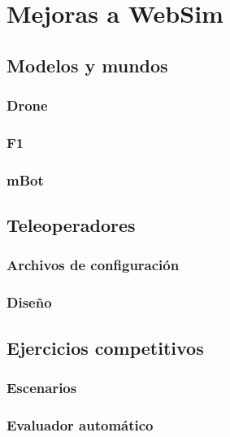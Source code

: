 \chapter{Mejoras a WebSim}
\label{chap:mejoras}

\section{Modelos y mundos}
\subsection{Drone}
\subsection{F1}
\subsection{mBot}


\section{Teleoperadores}
\subsection{Archivos de configuración}
\subsection{Diseño}

\section{Ejercicios competitivos}
\subsection{Escenarios}
\subsection{Evaluador automático}